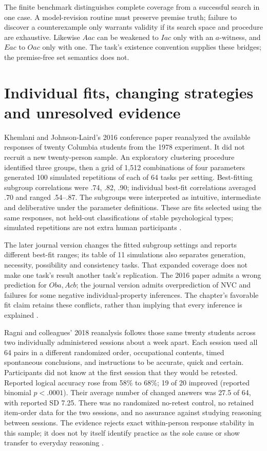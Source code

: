 The finite benchmark distinguishes complete coverage from a successful
search in one case. A model-revision routine must preserve premise truth;
failure to discover a counterexample only warrants validity if its search
space and procedure are exhaustive. Likewise \(Aac\) can be weakened
to \(Iac\) only with an \(a\)-witness, and \(Eac\) to \(Oac\)
only with one. The task's existence convention supplies these bridges;
the premise-free set semantics does not.

\section{Individual fits, changing strategies and unresolved evidence}
\label{sec:p19-r33-individual}

Khemlani and Johnson-Laird's 2016 conference paper reanalyzed the available
responses of twenty Columbia students from the 1978 experiment. It did not
recruit a new twenty-person sample. An exploratory clustering procedure
identified three groups, then a grid of 1,512 combinations of four
parameters generated 100 simulated repetitions of each of 64 tasks per
setting. Best-fitting subgroup correlations were .74, .82, .90; individual
best-fit correlations averaged .70 and ranged .54--.87. The subgroups
were interpreted as intuitive, intermediate and deliberative under the
parameter definitions. These are fits selected using the same responses,
not held-out classifications of stable psychological types; simulated
repetitions are not extra human participants
\cite[pp.~3--6]{KhemlaniJohnsonLaird2016IndividualSyllogisms}.

The later journal version changes the fitted subgroup settings and reports
different best-fit ranges; its table of 11 simulations also separates
generation, necessity, possibility and consistency tasks. That expanded
coverage does not make one task's result another task's replication.
The 2016 paper admits a wrong prediction for \(Oba,Acb\); the journal
version admits overprediction of NVC and failures for some negative
individual-property inferences. The chapter's favorable fit claim retains
these conflicts, rather than implying that every inference is explained
\cite[p.~6]{KhemlaniJohnsonLaird2016IndividualSyllogisms}
\cite[pp.~298--301]{KhemlaniJohnsonLaird2021OnlineProperties}.

Ragni and colleagues' 2018 reanalysis follows those same twenty students
across two individually administered sessions about a week apart. Each
session used all 64 pairs in a different randomized order, occupational
contents, timed spontaneous conclusions, and instructions to be accurate,
quick and certain. Participants did not know at the first session that
they would be retested. Reported logical accuracy rose from 58\% to 68\%;
19 of 20 improved (reported binomial \(p<.0001\)). Their average number
of changed answers was 27.5 of 64, with reported SD 7.25. There was no
randomized no-retest control, no retained item-order data for the two
sessions, and no assurance against studying reasoning between sessions.
The evidence rejects exact within-person response stability in this sample;
it does not by itself identify practice as the sole cause or show transfer
to everyday reasoning \cite[pp.~2--5]{RagniEtAl2018LogicalWithoutFeedback}.

